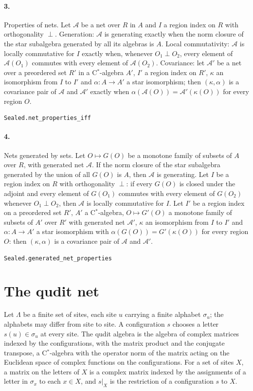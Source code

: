 \documentclass[11pt]{article}
\begin{document}
\paragraph{3.} Properties of nets. Let $\mathcal A$ be a net over $R$ in $A$ and $I$ a region index on $R$ with orthogonality $\perp$. Generation: $\mathcal A$ is generating exactly when the norm closure of the star subalgebra generated by all its algebras is $A$. Local commutativity: $\mathcal A$ is locally commutative for $I$ exactly when, whenever $O_1 \perp O_2$, every element of $\mathcal A(O_1)$ commutes with every element of $\mathcal A(O_2)$. Covariance: let $\mathcal A'$ be a net over a preordered set $R'$ in a C$^*$-algebra $A'$, $I'$ a region index on $R'$, $\kappa$ an isomorphism from $I$ to $I'$ and $\alpha : A \to A'$ a star isomorphism; then $(\kappa, \alpha)$ is a covariance pair of $\mathcal A$ and $\mathcal A'$ exactly when $\alpha(\mathcal A(O)) = \mathcal A'(\kappa(O))$ for every region $O$.\par{\footnotesize\texttt{Sealed.net\_properties\_iff}}

\paragraph{4.} Nets generated by sets. Let $O \mapsto G(O)$ be a monotone family of subsets of $A$ over $R$, with generated net $\mathcal A$. If the norm closure of the star subalgebra generated by the union of all $G(O)$ is $A$, then $\mathcal A$ is generating. Let $I$ be a region index on $R$ with orthogonality $\perp$: if every $G(O)$ is closed under the adjoint and every element of $G(O_1)$ commutes with every element of $G(O_2)$ whenever $O_1 \perp O_2$, then $\mathcal A$ is locally commutative for $I$. Let $I'$ be a region index on a preordered set $R'$, $A'$ a C$^*$-algebra, $O \mapsto G'(O)$ a monotone family of subsets of $A'$ over $R'$ with generated net $\mathcal A'$, $\kappa$ an isomorphism from $I$ to $I'$ and $\alpha : A \to A'$ a star isomorphism with $\alpha(G(O)) = G'(\kappa(O))$ for every region $O$: then $(\kappa, \alpha)$ is a covariance pair of $\mathcal A$ and $\mathcal A'$.\par{\footnotesize\texttt{Sealed.generated\_net\_properties}}

\section*{The qudit net}
Let $\Lambda$ be a finite set of sites, each site $u$ carrying a finite alphabet $\sigma_u$; the alphabets may differ from site to site. A configuration $s$ chooses a letter $s(u) \in \sigma_u$ at every site. The qudit algebra is the algebra of complex matrices indexed by the configurations, with the matrix product and the conjugate transpose, a C$^*$-algebra with the operator norm of the matrix acting on the Euclidean space of complex functions on the configurations. For a set of sites $X$, a matrix on the letters of $X$ is a complex matrix indexed by the assignments of a letter in $\sigma_x$ to each $x \in X$, and $s|_X$ is the restriction of a configuration $s$ to $X$.
\end{document}
